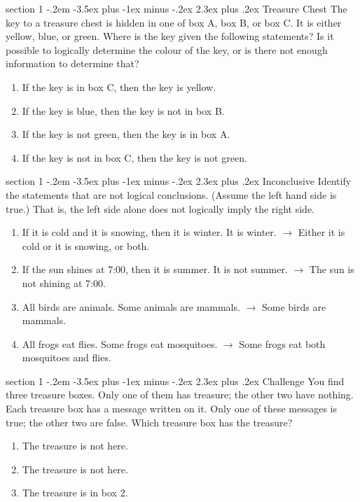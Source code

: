 \documentclass[12pt,letterpaper]{article}
\makeatletter
\newenvironment{problem}{\@startsection
       {section}
       {1}
       {-.2em}
       {-3.5ex plus -1ex minus -.2ex}
       {2.3ex plus .2ex}
       {\pagebreak[3]%
       \large\bf\noindent{Problem }
       }
       }
\makeatother
\begin{document}
\begin{problem}{Treasure Chest}
The key to a treasure chest is hidden in one of box A, box B, or box C.
It is either yellow, blue, or green. Where is the key given the
following statements? Is it possible to logically determine the colour
of the key, or is there not enough information to determine that?

 \begin{enumerate}
  \item If the key is in box C, then the key is yellow.
  \item If the key is blue, then the key is not in box B.
  \item If the key is not green, then the key is in box A.
  \item If the key is not in box C, then the key is not green.
 \end{enumerate}
\end{problem}

\begin{problem}{Inconclusive}
 Identify the statements that are not logical conclusions. (Assume the
 left hand side is true.) That is, the left side alone does not logically
 imply the right side.
 
 \begin{enumerate}[\hspace{.5cm}a.]
  \item If it is cold and it is snowing, then it is winter. It is winter. $\to$ Either it is cold or it is snowing, or both.
  \item If the sun shines at 7:00, then it is summer. It is not summer. $\to$ The sun is not shining at 7:00.
  \item All birds are animals. Some animals are mammals. $\to$ Some birds are mammals.
  \item All frogs eat flies. Some frogs eat mosquitoes. $\to$ Some frogs eat both mosquitoes and flies.
 \end{enumerate}

\end{problem}


\begin{problem}{Challenge}
You find three treasure boxes. Only one of them has treasure;
the other two have nothing. Each treasure box has a message written
on it. Only one of these messages is true; the other two are false.
Which treasure box has the treasure?

\begin{enumerate}
\item The treasure is not here.
\item The treasure is not here.
\item The treasure is in box 2.
\end{enumerate}
\end{problem}
\end{document}
